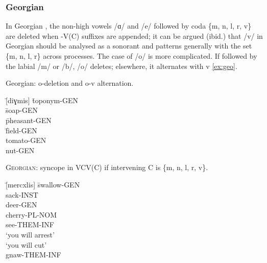 \subsubsection{Georgian}\label{ss:georgian}

In Georgian \citep[p.~90]{Butskh2002}, the non-high vowels /ɑ/ and /e/ followed by coda \{m, n, l, r, v\} are deleted when -V(C) suffixes are appended\footnotemark; it can be argued (ibid.) that /v/ in Georgian should be analysed as a sonorant and patterns generally with the set \{m, n, l, r\} across processes. The case of /o/ is more complicated. If followed by the labial /m/ or /b/, /o/ deletes; elsewhere, it alternates with v \cref{ex:geo}.

\begin{example}\label{ex:geo} Georgian: o-deletion and o-v alternation. \citep[p.~82~\&~95]{Butskh2002}
\begin{tabbing}
  \tab[2cm] \=  [diɣmis] \tab[2cm] \=  toponym-{\sc\scriptsize GEN} \\
    \> \= soap-{\sc\scriptsize GEN} \\
   \> [xoxbis] \> \= pheasant-{\sc\scriptsize GEN} \\
   \> [mindvris] \> \= field-{\sc\scriptsize GEN}\\
   \tab[2cm] \> [p'amidvris] \tab[2cm] \> tomato-{\sc\scriptsize GEN}\\
   \tab[2cm] \> [nigvzis] \tab[2cm] \> nut-{\sc\scriptsize GEN}
\end{tabbing}
\end{example}


\begin{example}\label{ex:gedeletion} \textsc{Georgian}: syncope in VCV(C) if intervening C is \{m, n, l, r, v\}. \citep{Butskh2002,Butskh2001}
\begin{tabbing}

   \tab[2cm] \= [mercxlis] \tab[2cm] \= swallow-{\sc\scriptsize GEN}\\
   \tab[2cm] \> [tʼomrit] \tab[2cm] \> sack-{\sc\scriptsize INST}\\
   \> [ʃvlis] \> deer-{\sc\scriptsize GEN}\\
         \> [blebi] \> cherry-{\sc\scriptsize PL}-{\sc\scriptsize NOM}\\
         \> [xedva] \> see-{\sc\scriptsize THEM}-{\sc\scriptsize INF}\\
    \> `you will arrest'\\
   \> [gatʃʼri] \> `you will cut'\\
         \> [xvra]\footnotemark \> gnaw-{\sc\scriptsize THEM}-{\sc\scriptsize INF}
    \end{tabbing}
\end{example}


